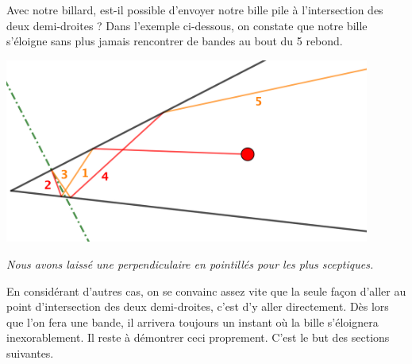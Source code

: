 Avec notre billard, est-il possible d'envoyer notre bille pile à l'intersection des deux demi-droites ?
Dans l'exemple ci-dessous, on constate que notre bille s'éloigne sans plus jamais rencontrer de bandes au bout du 5\ieme{} rebond.
 
\medskip

\begin{center}
	\includegraphics[width=12cm]{content/example-divergence.png}
	
	\itshape\small
	Nous avons laissé une perpendiculaire en pointillés pour les plus sceptiques.
\end{center}

\medskip

En considérant d'autres cas, on se convainc assez vite que la seule façon d'aller au point d'intersection des deux demi-droites, c'est d'y aller directement.
Dès lors que l'on fera une bande, il arrivera toujours un instant où la bille s'éloignera inexorablement. Il reste à démontrer ceci proprement. C'est le but des sections suivantes.